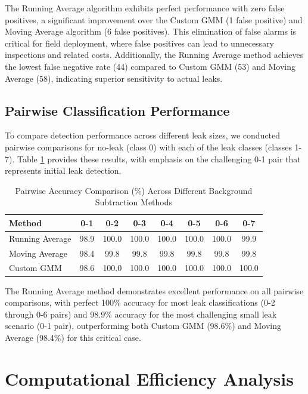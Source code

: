 The Running Average algorithm exhibits perfect performance with zero false positives, a significant improvement over the Custom GMM (1 false positive) and Moving Average algorithm (6 false positives). This elimination of false alarms is critical for field deployment, where false positives can lead to unnecessary inspections and related costs. Additionally, the Running Average method achieves the lowest false negative rate (44) compared to Custom GMM (53) and Moving Average (58), indicating superior sensitivity to actual leaks.

\subsection{Pairwise Classification Performance}

To compare detection performance across different leak sizes, we conducted pairwise comparisons for no-leak (class 0) with each of the leak classes (classes 1-7). Table \ref{tab:pairwise_comparison} provides these results, with emphasis on the challenging 0-1 pair that represents initial leak detection.

\begin{table}[htbp]
\caption{Pairwise Accuracy Comparison (\%) Across Different Background Subtraction Methods}
\label{tab:pairwise_comparison}
\begin{tabular}{|l|c|c|c|c|c|c|c|}
\hline
\textbf{Method} & \textbf{0-1} & \textbf{0-2} & \textbf{0-3} & \textbf{0-4} & \textbf{0-5} & \textbf{0-6} & \textbf{0-7} \\
\hline
Running Average & 98.9 & 100.0 & 100.0 & 100.0 & 100.0 & 100.0 & 99.9 \\
\hline
Moving Average & 98.4 & 99.8 & 99.8 & 99.8 & 99.8 & 99.8 & 99.8 \\
\hline
Custom GMM & 98.6 & 100.0 & 100.0 & 100.0 & 100.0 & 100.0 & 100.0 \\
\hline
\end{tabular}
\end{table}

The Running Average method demonstrates excellent performance on all pairwise comparisons, with perfect 100\% accuracy for most leak classifications (0-2 through 0-6 pairs) and 98.9\% accuracy for the most challenging small leak scenario (0-1 pair), outperforming both Custom GMM (98.6\%) and Moving Average (98.4\%) for this critical case.

\section{Computational Efficiency Analysis}

